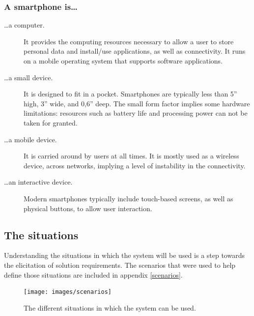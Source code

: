 \subsubsection{A smartphone is\ldots}

\begin{description}

\item[\ldots a computer.] 
It provides the computing resources necessary to allow a user to store personal data and install/use applications, as well as connectivity.
It runs on a mobile operating system that supports software applications.

\item[\ldots a small device.] 
It is designed to fit in a pocket.
Smartphones are typically less than 5'' high, 3'' wide, and 0,6'' deep.
The small form factor implies some hardware limitations: resources such as battery life and processing power can not be taken for granted.

\item[\ldots a mobile device.]
It is carried around by users at all times.
It is mostly used as a wireless device, across networks, implying a level of instability in the connectivity.

\item[\ldots an interactive device.]
Modern smartphones typically include touch-based screens, as well as physical buttons, to allow user interaction.

\end{description}

\subsection{The situations}
\label{sec:scenarios}

Understanding the situations in which the system will be used is a step towards the elicitation of solution requirements.
The scenarios that were used to help define those situations are included in appendix \ref{scenarios}.

\begin{figure}[htb]
  \centering
    \texttt{[image: images/scenarios]}
    \caption{The different situations in which the system can be used.}
    \label{fig:scenarios}
\end{figure}

